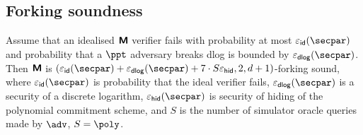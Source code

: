 \documentclass[runningheads,11pt]{llncs}
\begin{document}
\subsection{Forking soundness}
\begin{lemma}
  Assume that an idealised $\bm{\mathsf{M}}$ verifier fails with probability at most
  $\epsid(\secpar)$ and probability that a $\ppt$ adversary breaks dlog is
  bounded by $\epsdlog(\secpar)$. Then $\bm{\mathsf{M}}$ is
  $(\epsid (\secpar) + \epsdlog (\secpar) + 7 \cdot S \epsh, 2, d + 1)$-forking
  sound, where
  $\epsid (\secpar)$ is probability that the ideal verifier fails, $\epsdlog
  (\secpar)$ is a security of a discrete logarithm, $\epsh (\secpar)$ is
    security of hiding of the polynomial commitment scheme, and $S$ is the
    number of simulator oracle queries made by $\adv$, $S = \poly$.
\end{lemma}
\end{document}
